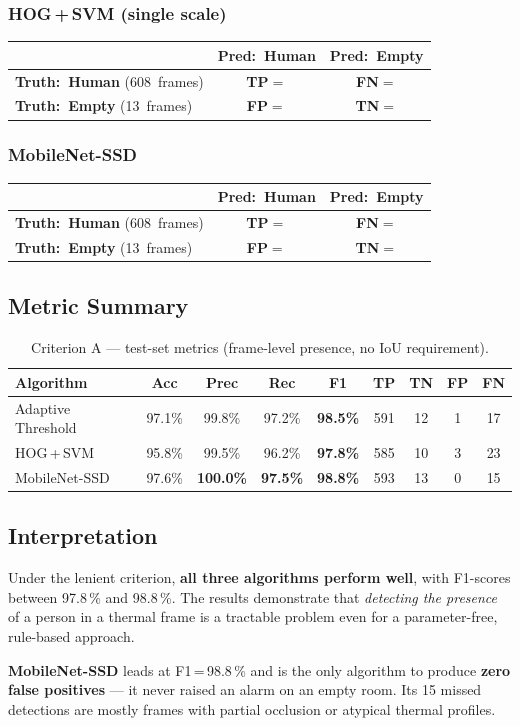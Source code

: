 \documentclass[11pt, a4paper]{article}
\newcommand{\confmat}[6]{%
    \def\cmTP{#1}\def\cmFN{#2}\def\cmFP{#3}\def\cmTN{#4}%
    \def\cmPos{#5}\def\cmNeg{#6}%
    \vspace{4pt}
    \begin{center}
    \renewcommand{\arraystretch}{1.8}%
    \begin{tabular}{lcc}
        \hline
        \rule{0pt}{2.4ex}%
        & \textbf{Pred:\ Human} & \textbf{Pred:\ Empty} \\[2pt]
        \hline
        \rule{0pt}{2.6ex}%
        \textbf{Truth:\ Human} (\cmPos\ frames)
            & \cellcolor{cellgreenlight}\textcolor{tpgreen}{\textbf{TP}}\;$=$\;\cmTP
            & \cellcolor{cellyellowlight}\textcolor{fnyellow}{\textbf{FN}}\;$=$\;\cmFN \\[4pt]
        \textbf{Truth:\ Empty} (\cmNeg\ frames)
            & \cellcolor{cellredlight}\textcolor{fpred}{\textbf{FP}}\;$=$\;\cmFP
            & \cellcolor{cellbluelight}\textcolor{tnblue}{\textbf{TN}}\;$=$\;\cmTN \\[2pt]
        \hline
    \end{tabular}
    \end{center}
    \vspace{4pt}
}
\begin{document}
\subsubsection*{HOG\,+\,SVM (single scale)}
\confmat{585}{23}{3}{10}{608}{13}

\subsubsection*{MobileNet-SSD}
\confmat{593}{15}{0}{13}{608}{13}

\subsection{Metric Summary}

\begin{table}[H]
\centering
\caption{Criterion A — test-set metrics (frame-level presence, no IoU requirement).}
\renewcommand{\arraystretch}{1.3}
\begin{tabular}{lcccccccc}
\toprule
\textbf{Algorithm}
    & \textbf{Acc} & \textbf{Prec} & \textbf{Rec} & \textbf{F1}
    & \textbf{TP}  & \textbf{TN}   & \textbf{FP}  & \textbf{FN} \\
\midrule
Adaptive Threshold
    & 97.1\% & 99.8\%          & 97.2\% & \textbf{98.5\%}
    & 591    & 12              &  1     & 17 \\
HOG\,+\,SVM
    & 95.8\% & 99.5\%          & 96.2\% & \textbf{97.8\%}
    & 585    & 10              &  3     & 23 \\
MobileNet-SSD
    & 97.6\% & \textbf{100.0\%}& \textbf{97.5\%} & \textbf{98.8\%}
    & 593    & 13              &  0     & 15 \\
\bottomrule
\end{tabular}
\label{tab:crA}
\end{table}

\subsection{Interpretation}

Under the lenient criterion, \textbf{all three algorithms perform well}, with F1-scores
between 97.8\,\% and 98.8\,\%.  The results demonstrate that \emph{detecting the
presence} of a person in a thermal frame is a tractable problem even for a
parameter-free, rule-based approach.

\textbf{MobileNet-SSD} leads at F1\,=\,98.8\,\% and is the only algorithm to produce
\textbf{zero false positives} — it never raised an alarm on an empty room.  Its 15 missed
detections are mostly frames with partial occlusion or atypical thermal profiles.
\end{document}

